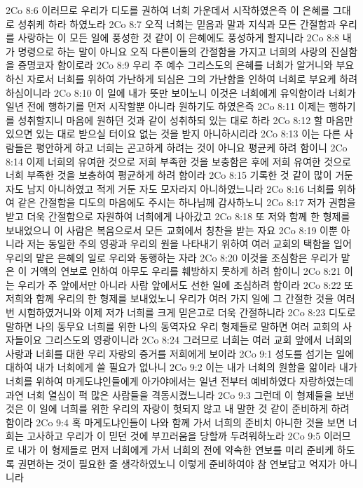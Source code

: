 2Co 8:6  이러므로 우리가 디도를 권하여 너희 가운데서 시작하였은즉 이 은혜를 그대로 성취케 하라 하였노라
2Co 8:7  오직 너희는 믿음과 말과 지식과 모든 간절함과 우리를 사랑하는 이 모든 일에 풍성한 것 같이 이 은혜에도 풍성하게 할지니라
2Co 8:8  내가 명령으로 하는 말이 아니요 오직 다른이들의 간절함을 가지고 너희의 사랑의 진실함을 증명코자 함이로라
2Co 8:9  우리 주 예수 그리스도의 은혜를 너희가 알거니와 부요하신 자로서 너희를 위하여 가난하게 되심은 그의 가난함을 인하여 너희로 부요케 하려 하심이니라
2Co 8:10  이 일에 내가 뜻만 보이노니 이것은 너희에게 유익함이라 너희가 일년 전에 행하기를 먼저 시작할뿐 아니라 원하기도 하였은즉
2Co 8:11  이제는 행하기를 성취할지니 마음에 원하던 것과 같이 성취하되 있는 대로 하라
2Co 8:12  할 마음만 있으면 있는 대로 받으실 터이요 없는 것을 받지 아니하시리라
2Co 8:13  이는 다른 사람들은 평안하게 하고 너희는 곤고하게 하려는 것이 아니요 평균케 하려 함이니
2Co 8:14  이제 너희의 유여한 것으로 저희 부족한 것을 보충함은 후에 저희 유여한 것으로 너희 부족한 것을 보충하여 평균하게 하려 함이라
2Co 8:15  기록한 것 같이 많이 거둔 자도 남지 아니하였고 적게 거둔 자도 모자라지 아니하였느니라
2Co 8:16  너희를 위하여 같은 간절함을 디도의 마음에도 주시는 하나님께 감사하노니
2Co 8:17  저가 권함을 받고 더욱 간절함으로 자원하여 너희에게 나아갔고
2Co 8:18  또 저와 함께 한 형제를 보내었으니 이 사람은 복음으로서 모든 교회에서 칭찬을 받는 자요
2Co 8:19  이뿐 아니라 저는 동일한 주의 영광과 우리의 원을 나타내기 위하여 여러 교회의 택함을 입어 우리의 맡은 은혜의 일로 우리와 동행하는 자라
2Co 8:20  이것을 조심함은 우리가 맡은 이 거액의 연보로 인하여 아무도 우리를 훼방하지 못하게 하려 함이니
2Co 8:21  이는 우리가 주 앞에서만 아니라 사람 앞에서도 선한 일에 조심하려 함이라
2Co 8:22  또 저희와 함께 우리의 한 형제를 보내었노니 우리가 여러 가지 일에 그 간절한 것을 여러 번 시험하였거니와 이제 저가 너희를 크게 믿은고로 더욱 간절하니라
2Co 8:23  디도로 말하면 나의 동무요 너희를 위한 나의 동역자요 우리 형제들로 말하면 여러 교회의 사자들이요 그리스도의 영광이니라
2Co 8:24  그러므로 너희는 여러 교회 앞에서 너희의 사랑과 너희를 대한 우리 자랑의 증거를 저희에게 보이라
2Co 9:1  성도를 섬기는 일에 대하여 내가 너희에게 쓸 필요가 없나니
2Co 9:2  이는 내가 너희의 원함을 앎이라 내가 너희를 위하여 마게도냐인들에게 아가야에서는 일년 전부터 예비하였다 자랑하였는데 과연 너희 열심이 퍽 많은 사람들을 격동시켰느니라
2Co 9:3  그런데 이 형제들을 보낸 것은 이 일에 너희를 위한 우리의 자랑이 헛되지 않고 내 말한 것 같이 준비하게 하려 함이라
2Co 9:4  혹 마게도냐인들이 나와 함께 가서 너희의 준비치 아니한 것을 보면 너희는 고사하고 우리가 이 믿던 것에 부끄러움을 당할까 두려워하노라
2Co 9:5  이러므로 내가 이 형제들로 먼저 너희에게 가서 너희의 전에 약속한 연보를 미리 준비케 하도록 권면하는 것이 필요한 줄 생각하였노니 이렇게 준비하여야 참 연보답고 억지가 아니니라
